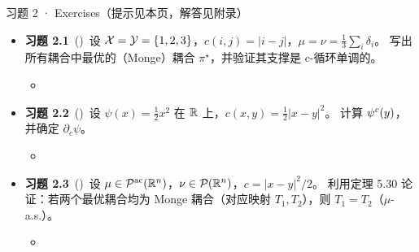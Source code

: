 \begin{frame}{习题 2 · Exercises（提示见本页，解答见附录）}
  \begin{itemize}
    \item \textbf{习题 2.1}~(\diffI)\ 设 $\mathcal{X}=\mathcal{Y}=\{1,2,3\}$，$c(i,j)=|i-j|$，$\mu=\nu=\frac13\sum_i\delta_i$。
      写出所有耦合中最优的（Monge）耦合 $\pi^\star$，并验证其支撑是 c-循环单调的。
      \begin{itemize}\footnotesize
        \item {}
      \end{itemize}

    \item \textbf{习题 2.2}~(\diffII)\ 设 $\psi(x)=\frac12 x^2$ 在 $\mathbb{R}$ 上，$c(x,y)=\frac12|x-y|^2$。
      计算 ${\psi}^{c}(y)$，并确定 $\partial_c\psi$。
      \begin{itemize}\footnotesize
        \item {}
      \end{itemize}

    \item \textbf{习题 2.3}~(\diffIII)\ 设 $\mu\in\mathcal{P}^{\mathrm{ac}}(\mathbb{R}^n)$，$\nu\in\mathcal{P}(\mathbb{R}^n)$，$c=|x-y|^2/2$。
      利用定理 5.30 论证：若两个最优耦合均为 Monge 耦合（对应映射 $T_1,T_2$），则 $T_1=T_2$（$\mu$-a.s.）。
      \begin{itemize}\footnotesize
        \item {}
      \end{itemize}
  \end{itemize}
\end{frame}

